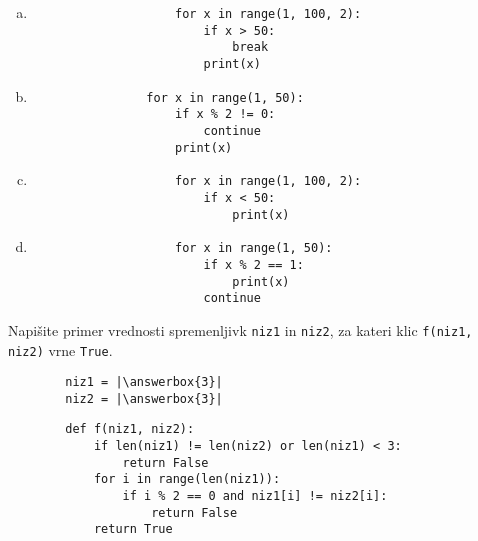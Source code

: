 \documentclass[arhiv, 10pt]{../izpit}
\newcommand{\inlinepy}[1]{\texttt{#1}}
\newcommand{\answerbox}[1]{\framebox{\vphantom{\large M}\hspace{#1cm}}}
\begin{document}
        \begin{multicols}{2}
        \begin{enumerate}[(a)]
\item 
                \begin{verbatim}
                    for x in range(1, 100, 2):
                        if x > 50:
                            break
                        print(x)
                \end{verbatim}
            
\item 
            \begin{verbatim}
                for x in range(1, 50):
                    if x % 2 != 0:
                        continue
                    print(x)
            \end{verbatim}
        
\item 
                \begin{verbatim}
                    for x in range(1, 100, 2):
                        if x < 50:
                            print(x)
                \end{verbatim}
            
\item 
                \begin{verbatim}
                    for x in range(1, 50):
                        if x % 2 == 1:
                            print(x)
                        continue
                \end{verbatim}
            
\end{enumerate}

        \end{multicols}
    
        \naloga*
        \begin{multicols}{2}
        \noindent
        Napišite primer vrednosti spremenljivk \inlinepy{niz1} in \inlinepy{niz2}, za kateri klic \inlinepy{f(niz1, niz2)} vrne \inlinepy{True}.
        \begin{verbatim}
        niz1 = |\answerbox{3}|
        niz2 = |\answerbox{3}|
        \end{verbatim}
        \vfil
        \columnbreak
        \begin{verbatim}
        def f(niz1, niz2):
            if len(niz1) != len(niz2) or len(niz1) < 3:
                return False
            for i in range(len(niz1)):
                if i % 2 == 0 and niz1[i] != niz2[i]:
                    return False
            return True
        \end{verbatim}
        \end{multicols}
    
\end{document}
